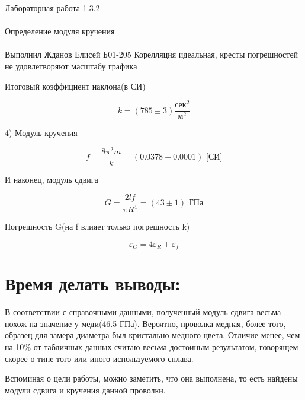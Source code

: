 \documentclass{astroedu-lab}
\begin{document}
\begin{problem}{\huge Лабораторная работа 1.3.2\\\\Определение модуля кручения\\\\Выполнил Жданов Елисей Б01-205}
Корелляция идеальная, кресты погрешностей не удовлетворяют масштабу графика

Итоговый коэффициент наклона(в СИ)

\begin{equation}
	k = (785 \pm 3) \frac{\text{сек}^2}{\text{м}^2}
\end{equation}

4) Модуль кручения

\begin{equation}
	f = \frac{8 \pi^2 m}{k} = (0.0378 \pm 0.0001) \text{ [СИ]}
\end{equation}

И наконец, модуль сдвига

\begin{equation}
	G = \frac{2 l f}{\pi R^4} = (43 \pm 1) \text{ ГПа}
\end{equation}

Погрешность G(на f влияет только погрешность k)

\begin{equation}
	\varepsilon_G = 4 \varepsilon_R +\varepsilon_f
\end{equation}

\section{Время делать выводы:}

В соответствии с справочными данными, полученный модуль сдвига весьма похож на значение у меди(46.5 ГПа). Вероятно, проволка медная, более того, образец для замера диаметра был кристально-медного цвета. Отличие менее, чем на 10$\%$ от табличных данных считаю весьма достоиным результатом, говорящем скорее о типе того или иного используемого сплава.

Вспоминая о цели работы, можно заметить, что она выполнена, то есть найдены модули сдвига и кручения данной проволки.

\end{problem}
\end{document}
